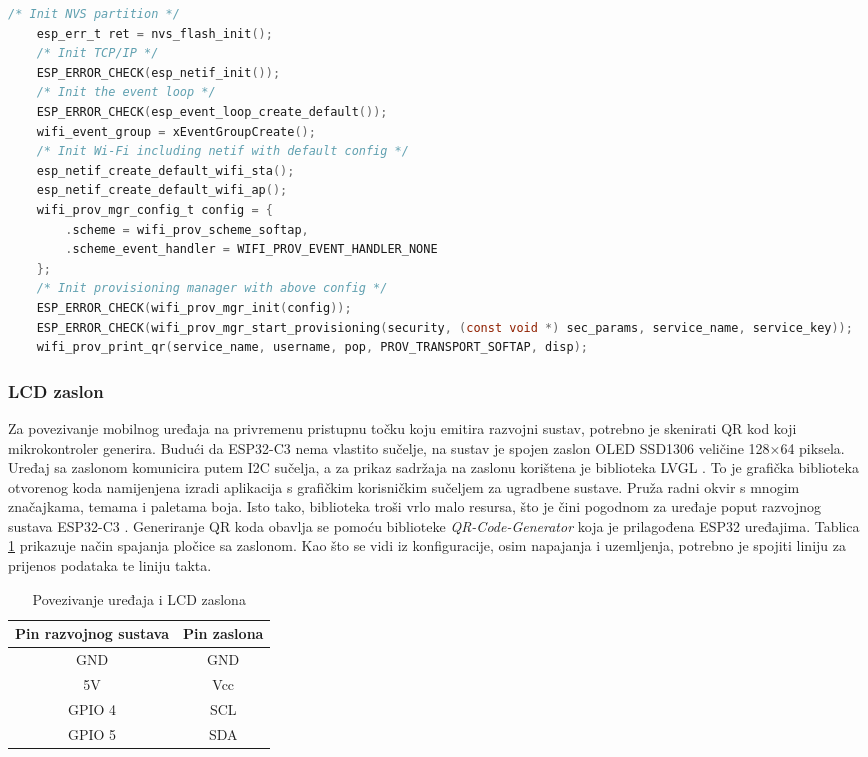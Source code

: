 \begin{lstlisting}[caption={Stvaranje pristupne točke}, language=c]
	/* Init NVS partition */
	esp_err_t ret = nvs_flash_init();
	/* Init TCP/IP */
	ESP_ERROR_CHECK(esp_netif_init());
	/* Init the event loop */
	ESP_ERROR_CHECK(esp_event_loop_create_default());
	wifi_event_group = xEventGroupCreate();
	/* Init Wi-Fi including netif with default config */
	esp_netif_create_default_wifi_sta();
	esp_netif_create_default_wifi_ap();
	wifi_prov_mgr_config_t config = {
		.scheme = wifi_prov_scheme_softap,
		.scheme_event_handler = WIFI_PROV_EVENT_HANDLER_NONE
	};
    /* Init provisioning manager with above config */
	ESP_ERROR_CHECK(wifi_prov_mgr_init(config));
	ESP_ERROR_CHECK(wifi_prov_mgr_start_provisioning(security, (const void *) sec_params, service_name, service_key));
	wifi_prov_print_qr(service_name, username, pop, PROV_TRANSPORT_SOFTAP, disp);
\end{lstlisting}

\subsubsection{LCD zaslon}

Za povezivanje mobilnog uređaja na privremenu pristupnu točku koju emitira razvojni sustav, potrebno je skenirati QR kod koji mikrokontroler generira. Budući da ESP32-C3 nema vlastito sučelje, na sustav je spojen zaslon OLED SSD1306 veličine 128×64 piksela. Uređaj sa zaslonom komunicira putem I2C sučelja, a za prikaz sadržaja na zaslonu korištena je biblioteka LVGL . To je grafička biblioteka otvorenog koda namijenjena izradi aplikacija s grafičkim korisničkim sučeljem  za ugradbene sustave. Pruža radni okvir s mnogim značajkama, temama i paletama boja. Isto tako, biblioteka troši vrlo malo resursa, što je čini pogodnom za uređaje poput razvojnog sustava ESP32-C3 \cite{lvgl}. Generiranje QR koda obavlja se pomoću biblioteke \textit{QR-Code-Generator} koja je prilagođena ESP32 uređajima. Tablica \ref{table:pinout_lcd} prikazuje način spajanja pločice sa zaslonom. Kao što se vidi iz konfiguracije, osim napajanja i uzemljenja, potrebno je spojiti liniju za prijenos podataka te liniju takta. 

\begin{table}[ht!]
	\centering
	\small
	\caption{Povezivanje uređaja i LCD zaslona}
	\begin{tabular}{|c| c|}
		\hline
		\rowcolor{lightblue}  
		\textbf{Pin razvojnog sustava} & \textbf{Pin zaslona} \\ \hline
		GND & GND \\ \hline
		5V & Vcc \\ \hline
		GPIO 4 & SCL  \\ \hline
		GPIO 5 & SDA \\ \hline
	\end{tabular}
	\label{table:pinout_lcd}
\end{table}

